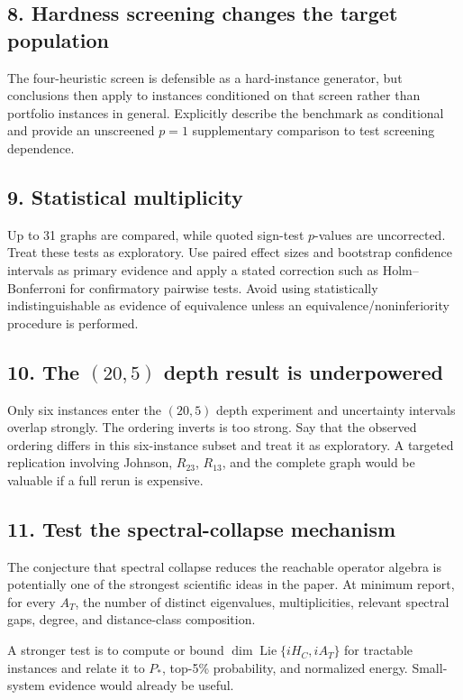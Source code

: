 \documentclass[11pt]{article}
\begin{document}
\subsection*{8. Hardness screening changes the target population}
The four-heuristic screen is defensible as a hard-instance generator, but conclusions then apply to instances conditioned on that screen rather than portfolio instances in general. Explicitly describe the benchmark as conditional and provide an unscreened $p=1$ supplementary comparison to test screening dependence.

\subsection*{9. Statistical multiplicity}
Up to 31 graphs are compared, while quoted sign-test $p$-values are uncorrected. Treat these tests as exploratory. Use paired effect sizes and bootstrap confidence intervals as primary evidence and apply a stated correction such as Holm--Bonferroni for confirmatory pairwise tests. Avoid using statistically indistinguishable as evidence of equivalence unless an equivalence/noninferiority procedure is performed.

\subsection*{10. The $(20,5)$ depth result is underpowered}
Only six instances enter the $(20,5)$ depth experiment and uncertainty intervals overlap strongly. The ordering inverts is too strong. Say that the observed ordering differs in this six-instance subset and treat it as exploratory. A targeted replication involving Johnson, $R_{23}$, $R_{13}$, and the complete graph would be valuable if a full rerun is expensive.

\subsection*{11. Test the spectral-collapse mechanism}
The conjecture that spectral collapse reduces the reachable operator algebra is potentially one of the strongest scientific ideas in the paper. At minimum report, for every $A_T$, the number of distinct eigenvalues, multiplicities, relevant spectral gaps, degree, and distance-class composition.

A stronger test is to compute or bound $\dim\operatorname{Lie}\{iH_C,iA_T\}$ for tractable instances and relate it to $P_*$, top-5\% probability, and normalized energy. Small-system evidence would already be useful.
\end{document}
